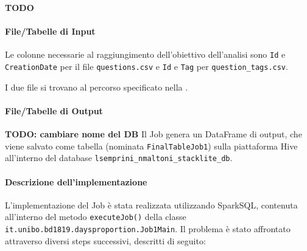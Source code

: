   \textbf{TODO}

  \paragraph{File/Tabelle di Input}\label{par:job1:spark:input}

  Le colonne necessarie al raggiungimento dell'obiettivo dell'analisi sono \texttt{Id} e \texttt{CreationDate} per il file \texttt{questions.csv}
  e \texttt{Id} e \texttt{Tag} per \texttt{question\_tags.csv}.

  I due file si trovano al percorso specificato nella .

  \paragraph{File/Tabelle di Output}\label{par:job1:spark:output}
  \textbf{TODO: cambiare nome del DB}
  Il Job genera un DataFrame di output, che viene salvato come tabella (nominata \texttt{FinalTableJob1})
  sulla piattaforma Hive all'interno del database \texttt{lsemprini\_nmaltoni\_stacklite\_db}.

  \paragraph{Descrizione dell'implementazione}\label{par:job1:spark:implementation}

  L'implementazione del Job è stata realizzata utilizzando SparkSQL, contenuta all'interno del metodo \texttt{executeJob()}
  della classe \texttt{it.unibo.bd1819.daysproportion.Job1Main}.
  Il problema è stato affrontato attraverso diversi steps successivi, descritti di seguito:

